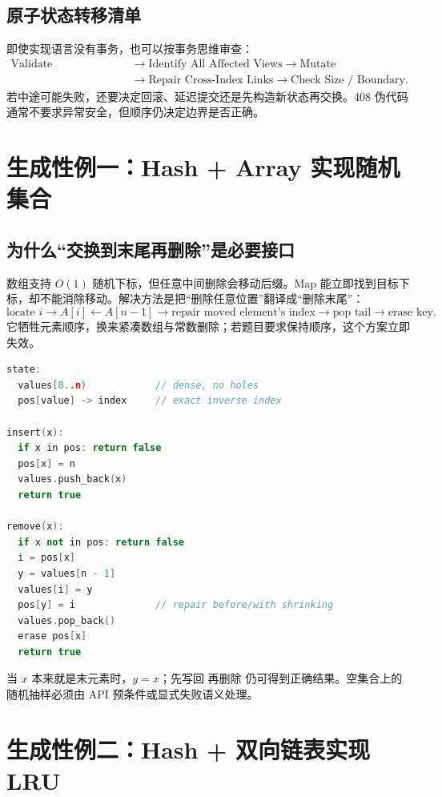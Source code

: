 \documentclass[UTF8,fontset=none,11pt,a4paper]{ctexart}
\begin{document}
\subsection{原子状态转移清单}
即使实现语言没有事务，也可以按事务思维审查：
\[
\begin{aligned}
\text{Validate Preconditions}
&\to \text{Identify All Affected Views}
\to \text{Mutate} \\
&\to \text{Repair Cross-Index Links}
\to \text{Check Size / Boundary}.
\end{aligned}
\]
若中途可能失败，还要决定回滚、延迟提交还是先构造新状态再交换。408 伪代码通常不要求异常安全，但顺序仍决定边界是否正确。

\section{生成性例一：Hash + Array 实现随机集合}

\subsection{为什么“交换到末尾再删除”是必要接口}
数组支持 $O(1)$ 随机下标，但任意中间删除会移动后缀。Map 能立即找到目标下标，却不能消除移动。解决方法是把“删除任意位置”翻译成“删除末尾”：
\[
\boxed{
\text{locate }i
\to A[i]\leftarrow A[n-1]
\to \text{repair moved element's index}
\to \text{pop tail}
\to \text{erase key}.}
\]
它牺牲元素顺序，换来紧凑数组与常数删除；若题目要求保持顺序，这个方案立即失效。

\begin{lstlisting}[language=C++,caption={随机集合的状态合同伪代码}]
state:
  values[0..n)            // dense, no holes
  pos[value] -> index     // exact inverse index

insert(x):
  if x in pos: return false
  pos[x] = n
  values.push_back(x)
  return true

remove(x):
  if x not in pos: return false
  i = pos[x]
  y = values[n - 1]
  values[i] = y
  pos[y] = i              // repair before/with shrinking
  values.pop_back()
  erase pos[x]
  return true
\end{lstlisting}
当 $x$ 本来就是末元素时，$y=x$；先写回  再删除  仍可得到正确结果。空集合上的随机抽样必须由 API 预条件或显式失败语义处理。

\section{生成性例二：Hash + 双向链表实现 LRU}
\end{document}
